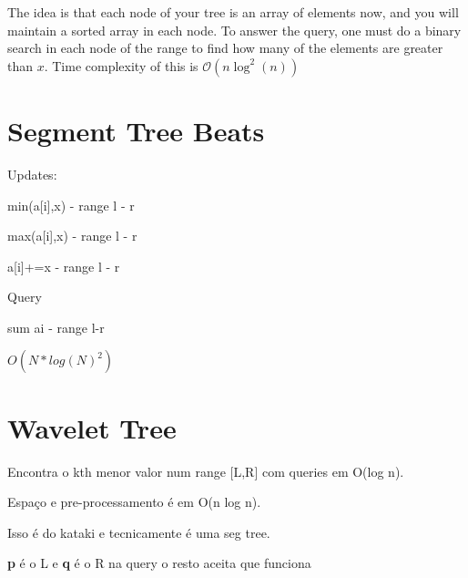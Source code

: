     The idea is that each node of your tree is an array of elements now, and you will maintain a sorted array in each node. To answer the query, one must do a binary search in each node of the range to find how many of the elements are greater than $x$. Time complexity of this is $\mathcal{O}(n\log^2(n))$

      
    
    \section{Segment Tree Beats}
    \tab Updates:
    
    min(a[i],x) - range l - r
    
    max(a[i],x) - range l - r
    
    a[i]+=x - range l - r
    
    Query
    
    sum ai - range l-r
    
    $O(N*log(N)^2)$
    
    \section{Wavelet Tree}
    \tab Encontra o kth menor valor num range [L,R] com queries em O(log n).
    
    Espaço e pre-processamento é em O(n log n).
    
    Isso é do kataki e tecnicamente é uma seg tree.
    
    \textbf{p} é o L e \textbf{q} é o R na query
    o resto aceita que funciona
    
    